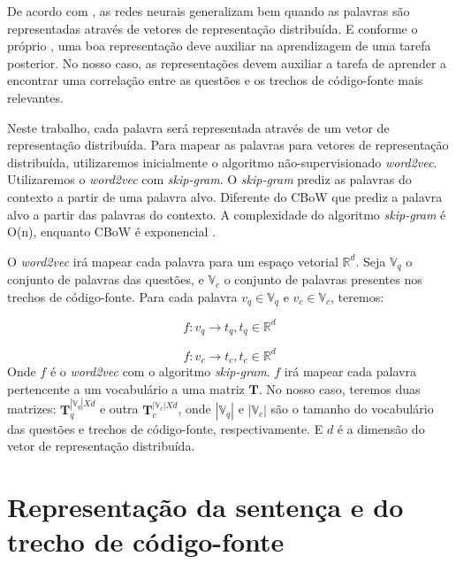 De acordo com \cite{Goodfellow-et-al-2016:representation-learning}, as redes neurais generalizam bem quando as palavras são representadas através de vetores de representação distribuída. E conforme o próprio \cite{Goodfellow-et-al-2016:representation-learning}, uma boa representação deve auxiliar na aprendizagem de uma tarefa posterior. No nosso caso, as representações devem auxiliar a tarefa de aprender a encontrar uma correlação entre as questões e os trechos de código-fonte mais relevantes.

Neste trabalho, cada palavra será representada através de um vetor de representação distribuída. Para mapear as palavras para vetores de representação distribuída, utilizaremos inicialmente o algoritmo não-supervisionado \textit{word2vec}. Utilizaremos o \textit{word2vec} com \textit{skip-gram}. O \textit{skip-gram} prediz as palavras do contexto a partir de uma palavra alvo. Diferente do CBoW que prediz a palavra alvo a partir das palavras do contexto. A complexidade do algoritmo \textit{skip-gram} é O(n), enquanto CBoW é exponencial . 

O \textit{word2vec} irá mapear cada palavra para um espaço vetorial $\mathbb{R}^{d}$. Seja $\mathbb{V}_{q}$ o conjunto de palavras das questões, e $\mathbb{V}_{c}$ o conjunto de palavras presentes nos trechos de código-fonte. Para cada palavra $v_{q} \in \mathbb{V}_{q}$ e $v_{c} \in \mathbb{V}_c$, teremos:

\begin{equation}
    f: v_{q} \rightarrow t_{q}, t_{q} \in \mathbb{R}^{d}
\end{equation}

\begin{equation}
    f: v_{c} \rightarrow t_{c}, t_{c} \in \mathbb{R}^{d}
\end{equation}
Onde $f$ é o \textit{word2vec} com o algoritmo \textit{skip-gram}. $f$ irá mapear cada palavra pertencente a um vocabulário a uma matriz $\bm{T}$.
No nosso caso, teremos duas matrizes: $\bm{T}_{q}^{|\mathbb{V}_{q}| X d}$ e outra $\bm{T}_{c}^{|\mathbb{V}_{c}| X d}$, onde $|\mathbb{V}_{q}|$ e $|\mathbb{V}_{c}|$ são o tamanho do vocabulário das questões e trechos de código-fonte, respectivamente. E $d$ é a dimensão do vetor de representação distribuída.

\section{Representação da sentença e do trecho de código-fonte}

